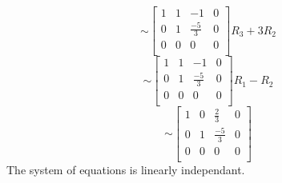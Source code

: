 \documentclass[12pt]{article}
\begin{document}
	\[\sim
		\left[
		\begin{array}{ccc|c}
		1 & 1 & -1 & 0\\
		0 & 1 & \frac{-5}{3} & 0\\
		0 & 0 & 0 & 0\\
		\end{array}
		\right] R_3 + 3R_2
	\]
	\[\sim
		\left[
		\begin{array}{ccc|c}
		1 & 1 & -1 & 0\\
		0 & 1 & \frac{-5}{3} & 0\\
		0 & 0 & 0 & 0\\
		\end{array}
		\right] R_1 - R_2
	\]
	\[\sim
		\left[
		\begin{array}{ccc|c}
		1 & 0 & \frac{2}{3} & 0\\
		0 & 1 &  \frac{-5}{3} & 0\\
		0 & 0 & 0 & 0\\
		\end{array}
		\right]
	\]
The system of equations is linearly independant. 
\end{document}
